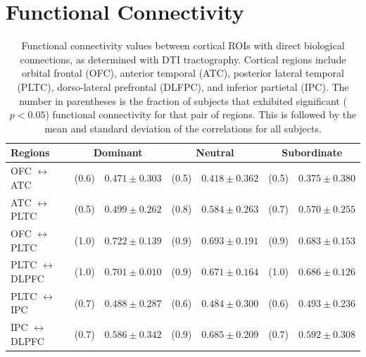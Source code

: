 \section{Functional Connectivity}
\label{appa}
\begin{table}[h]
\begin{center}
\tiny
\begin{tabular}{| l | r l | r l | r l |}
\hline
Regions & \multicolumn{2}{|c|}{Dominant} & \multicolumn{2}{|c|}{Neutral} & \multicolumn{2}{|c|}{Subordinate}\\
\hline
OFC $\leftrightarrow$ ATC &     (0.6) & $0.471 \pm 0.303$ &  (0.5) & $ 0.418 \pm 0.362$ &  (0.5) & $ 0.375 \pm 0.380$\\
ATC $\leftrightarrow$ PLTC &    (0.5) & $0.499 \pm 0.262$ &  (0.8) & $ 0.584 \pm 0.263$ &  (0.7) & $ 0.570 \pm 0.255$\\
OFC $\leftrightarrow$ PLTC &   (1.0) & $0.722 \pm 0.139$ &  (0.9) & $ 0.693 \pm 0.191$ &  (0.9) & $ 0.683 \pm 0.153$\\
PLTC $\leftrightarrow$ DLPFC & (1.0) & $0.701 \pm 0.010$ &  (0.9) & $ 0.671 \pm 0.164$ & (1.0)  & $ 0.686 \pm 0.126$\\
PLTC $\leftrightarrow$ IPC &    (0.7) & $0.488 \pm 0.287$ &  (0.6) & $ 0.484 \pm 0.300$ &  (0.6) & $ 0.493 \pm 0.236$\\
IPC $\leftrightarrow$ DLPFC &   (0.7) & $0.586 \pm 0.342$ &  (0.9) & $ 0.685 \pm 0.209$ &  (0.7) & $ 0.592 \pm 0.308$\\
\hline
\end{tabular}
\caption{Functional connectivity values between cortical ROIs with direct biological connections, as determined with DTI tractography. Cortical regions include orbital frontal (OFC), anterior temporal (ATC), posterior lateral temporal (PLTC), dorso-lateral prefrontal (DLFPC), and inferior partietal (IPC). The number in parentheses is the fraction of subjects that exhibited significant ($p < 0.05$) functional connectivity for that pair of regions. This is followed by the mean and standard deviation of the correlations for all subjects.}
\label{table:fcvalues}
\end{center}
\end{table}

